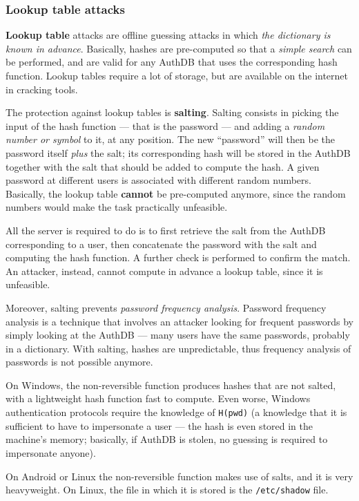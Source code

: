 \documentclass[10pt]{extreport}
\begin{document}
\subsubsection{Lookup table attacks}

\textbf{Lookup table} attacks are offline guessing attacks in which \emph{the dictionary
is known in advance}. Basically, hashes are pre\--computed so that a
\emph{simple search} can be performed, and are valid for any AuthDB that uses
the corresponding hash function. Lookup tables require a lot of storage, but
are available on the internet in cracking tools.

The protection against lookup tables is \textbf{salting}. Salting consists in
picking the input of the hash function --- that is the password --- and adding a
\emph{random number or symbol} to it, at any position. The new ``password''
will then be the password itself \emph{plus} the salt; its corresponding
hash will be stored in the AuthDB together with the salt that should be added
to compute the hash. A given password at different users is associated with
different random numbers. Basically, the lookup table \textbf{cannot} be
pre\--computed anymore, since the random numbers would make the task
practically unfeasible.

All the server is required to do is to first retrieve the salt from the AuthDB
corresponding to a user, then concatenate the password with the salt and
computing the hash function. A further check is performed to confirm the match.
An attacker, instead, cannot compute in advance a lookup table, since it is
unfeasible.

Moreover, salting prevents \emph{password frequency analysis}. Password
frequency analysis is a technique that involves an attacker looking for
frequent passwords by simply looking at the AuthDB --- many users have the same
passwords, probably in a dictionary. With salting, hashes are unpredictable,
thus frequency analysis of passwords is not possible anymore.

On Windows, the non\--reversible function produces hashes that are not salted, with a
lightweight hash function fast to compute. Even worse, Windows authentication
protocols require the knowledge of \texttt{H(pwd)} (a knowledge that it is
sufficient to have to impersonate a user --- the hash is even stored in the
machine's memory; basically, if AuthDB is stolen, no guessing is required to
impersonate anyone).

On Android or Linux the non\--reversible function makes use of salts, and it is
very heavyweight. On Linux, the file in which it is stored is the
\texttt{/etc/shadow} file.
\end{document}
